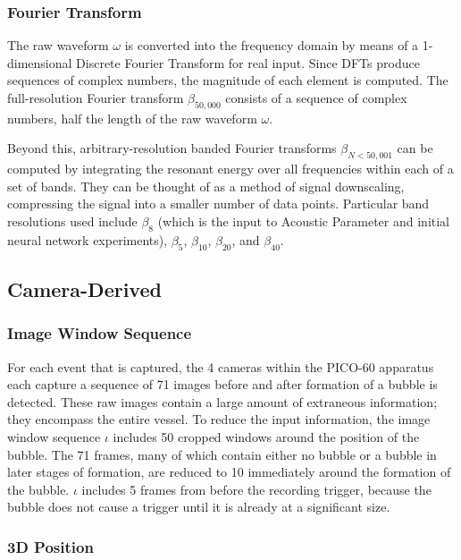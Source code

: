 \documentclass[10pt]{article}
\begin{document}
\subsubsection{Fourier Transform}

The raw waveform $\omega$ is converted into the frequency domain by means of a 1-dimensional Discrete Fourier Transform for real input. Since DFTs produce sequences of complex numbers, the magnitude of each element is computed. The full-resolution Fourier transform $\beta _{50,000}$ consists of a sequence of complex numbers, half the length of the raw waveform $\omega$.

Beyond this, arbitrary-resolution banded Fourier transforms $\beta _{N<50,001}$ can be computed by integrating the resonant energy over all frequencies within each of a set of bands. They can be thought of as a method of signal downscaling, compressing the signal into a smaller number of data points. Particular band resolutions used include $\beta _{8}$ (which is the input to Acoustic Parameter and initial neural network experiments), $\beta _{5}$, $\beta _{10}$, $\beta _{20}$, and $\beta _{40}$.

\subsection{Camera-Derived}

\subsubsection{Image Window Sequence}

For each event that is captured, the 4 cameras within the PICO-60 apparatus each capture a sequence of 71 images before and after formation of a bubble is detected. These raw images contain a large amount of extraneous information; they encompass the entire vessel. To reduce the input information, the image window sequence $\iota$ includes 50 cropped windows around the position of the bubble. The 71 frames, many of which contain either no bubble or a bubble in later stages of formation, are reduced to 10 immediately around the formation of the bubble. $\iota$ includes 5 frames from before the recording trigger, because the bubble does not cause a trigger until it is already at a significant size.

\subsubsection{3D Position}
\end{document}
